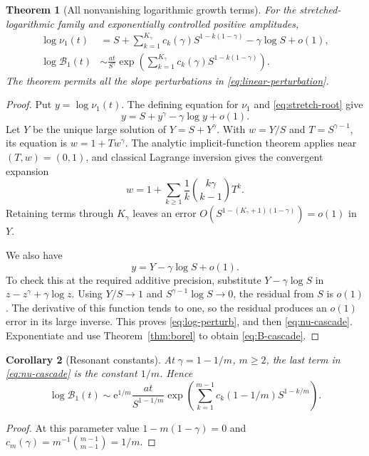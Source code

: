 \documentclass[11pt,a4paper]{article}
\numberwithin{equation}{section}
\newtheorem{theorem}{Theorem}[section]
\newtheorem{corollary}[theorem]{Corollary}
\theoremstyle{definition}
\theoremstyle{remark}
\newcommand{\Bcal}{\mathcal B}
\newcommand{\ee}{\mathrm e}
\begin{document}
\begin{theorem}[All nonvanishing logarithmic growth terms]
\label{thm:cascade}
For the stretched-logarithmic family and exponentially controlled
positive amplitudes,
\begin{align}
 \log\nu_1(t)
 &=S+\sum_{k=1}^{K_\gamma}
 c_k(\gamma)S^{1-k(1-\gamma)}-\gamma\log S+o(1),
 \label{eq:nu-cascade}\\
 \log\Bcal_1(t)
 &\sim\frac{at}{S^\gamma}
 \exp\left(\sum_{k=1}^{K_\gamma}
 c_k(\gamma)S^{1-k(1-\gamma)}\right).
 \label{eq:B-cascade}
\end{align}
The theorem permits all the slope perturbations in
\eqref{eq:linear-perturbation}.
\end{theorem}
\begin{proof}
Put $y=\log\nu_1(t)$. The defining equation for $\nu_1$ and
\eqref{eq:stretch-root} give
\begin{equation}
 y=S+y^\gamma-\gamma\log y+o(1).
 \label{eq:y-reverse}
\end{equation}
Let $Y$ be the unique large solution of $Y=S+Y^\gamma$.
With $w=Y/S$ and $T=S^{\gamma-1}$, its equation is
$w=1+Tw^\gamma$. The analytic implicit-function theorem applies near
$(T,w)=(0,1)$, and classical Lagrange inversion gives the convergent
expansion
\begin{equation}
 w=1+\sum_{k\ge1}\frac1k\binom{k\gamma}{k-1}T^k.
 \label{eq:scalar-reversion}
\end{equation}
Retaining terms through $K_\gamma$ leaves an error
$O(S^{1-(K_\gamma+1)(1-\gamma)})=o(1)$ in $Y$.

We also have
\begin{equation}
 y=Y-\gamma\log S+o(1).
 \label{eq:log-perturb}
\end{equation}
To check this at the required additive precision, substitute
$Y-\gamma\log S$ in $z-z^\gamma+\gamma\log z$.
Using $Y/S\to1$ and
$S^{\gamma-1}\log S\to0$, the residual from $S$ is $o(1)$.
The derivative of this function tends to one, so the residual produces
an $o(1)$ error in its large inverse. This proves
\eqref{eq:log-perturb}, and then \eqref{eq:nu-cascade}.
Exponentiate and use Theorem~\ref{thm:borel} to obtain
\eqref{eq:B-cascade}.
\end{proof}

\begin{corollary}[Resonant constants]
\label{cor:resonances}
At $\gamma=1-1/m$, $m\ge2$, the last term in
\eqref{eq:nu-cascade} is the constant $1/m$. Hence
\begin{equation}
 \log\Bcal_1(t)\sim
 \ee^{1/m}\frac{at}{S^{1-1/m}}
 \exp\left(\sum_{k=1}^{m-1}
 c_k(1-1/m)S^{1-k/m}\right).
 \label{eq:resonant-constant}
\end{equation}
\end{corollary}
\begin{proof}
At this parameter value $1-m(1-\gamma)=0$ and
$c_m(\gamma)=m^{-1}\binom{m-1}{m-1}=1/m$.
\end{proof}
\end{document}
